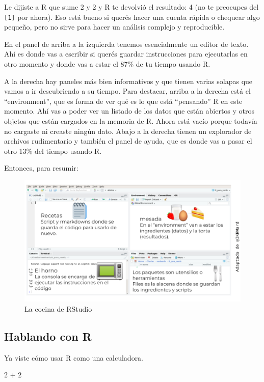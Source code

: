 \documentclass[
  openany]{book}
\newenvironment{Shaded}{\begin{snugshade}}{\end{snugshade}}
\newcommand{\DecValTok}[1]{\textcolor[rgb]{0.00,0.00,0.81}{#1}}
\newcommand{\SpecialCharTok}[1]{\textcolor[rgb]{0.00,0.00,0.00}{#1}}
\begin{document}
Le dijiste a R que sume 2 y 2 y R te devolvió el resultado: 4 (no te preocupes del \texttt{{[}1{]}} por ahora).
Eso está bueno si querés hacer una cuenta rápida o chequear algo pequeño, pero no sirve para hacer un análisis complejo y reproducible.

En el panel de arriba a la izquierda tenemos esencialmente un editor de texto.
Ahí es donde vas a escribir si querés guardar instrucciones para ejecutarlas en otro momento y donde vas a estar el 87\% de tu tiempo usando R.

A la derecha hay paneles más bien informativos y que tienen varias solapas que vamos a ir descubriendo a su tiempo.
Para destacar, arriba a la derecha está el ``environment'', que es forma de ver qué es lo que está ``pensando'' R en este momento.
Ahí vas a poder ver un listado de los datos que están abiertos y otros objetos que están cargados en la memoria de R.
Ahora está vacío porque todavía no cargaste ni creaste ningún dato.
Abajo a la derecha tienen un explorador de archivos rudimentario y también el panel de ayuda, que es donde vas a pasar el otro 13\% del tiempo usando R.

Entonces, para resumir:

\begin{figure}
\centering
\includegraphics{img/rstudio-cocina.png}
\caption{La cocina de RStudio}
\end{figure}

\hypertarget{hablando-con-r}{%
\subsection{Hablando con R}\label{hablando-con-r}}

Ya viste cómo usar R como una calculadora.

\begin{Shaded}
\begin{Highlighting}[]
\DecValTok{2} \SpecialCharTok{+} \DecValTok{2}
\end{Highlighting}
\end{Shaded}
\end{document}
